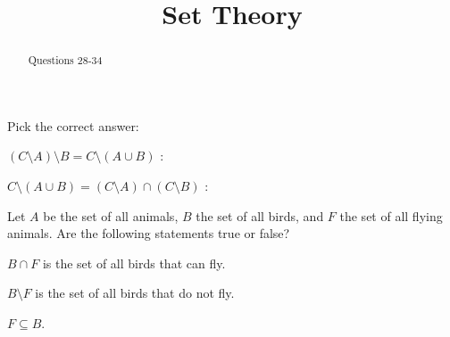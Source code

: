 \documentclass{ximera}
\title{Set Theory}
\begin{document}
\begin{abstract}
  Questions 28-34
\end{abstract}
\maketitle

Pick the correct answer:
\begin{question}
$(C \setminus A) \setminus B = C \setminus (A \cup B)$ :
\begin{solution}
\begin{multiple-choice}
\end{multiple-choice}
\end{solution}
\end{question}

\begin{question}
$C \setminus (A \cup B) = (C \setminus A) \cap (C\setminus B)$ :
\begin{solution}
\begin{multiple-choice}
\end{multiple-choice}
\end{solution}
\end{question}


\begin{question}
Let $A$ be the set of all animals, $B$ the set of all birds, and $F$
the set of all flying animals. Are the following statements true or false?

\begin{question}
$B\cap F$ is the set of all birds that can fly.
\begin{solution}
\begin{multiple-choice}
\end{multiple-choice}
\end{solution}
\end{question}

\begin{question}
$B\setminus F$ is the set of all birds that do not fly.
\begin{solution}
\begin{multiple-choice}
\end{multiple-choice}
\end{solution}
\end{question}

\begin{question}
$F\subseteq B$.
\begin{solution}
\begin{multiple-choice}
\end{multiple-choice}
\end{solution}
\end{question}

\end{question}
\end{document}
